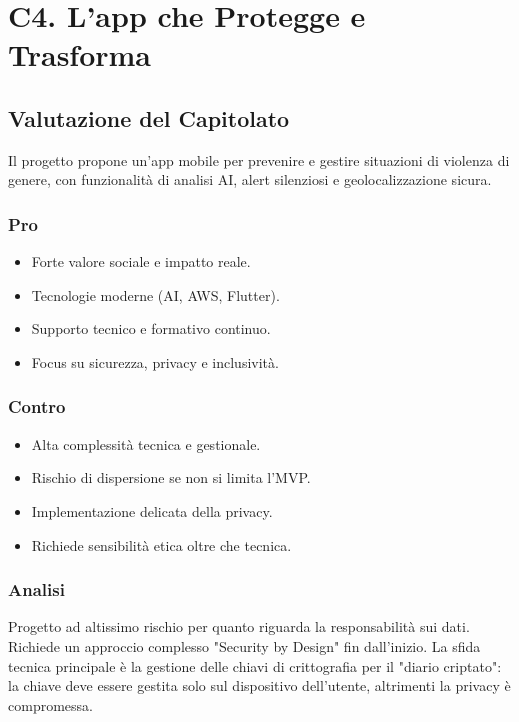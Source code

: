 \documentclass[a4paper, 11pt, oneside]{scrartcl} %
\begin{document}
\section{C4. L’app che Protegge e Trasforma}
\subsection*{Valutazione del Capitolato}
Il progetto propone un’app mobile per prevenire e gestire situazioni di violenza di genere, con funzionalità di analisi AI, alert silenziosi e geolocalizzazione sicura.

\subsubsection*{Pro}
\begin{itemize}
    \item Forte valore sociale e impatto reale.
    \item Tecnologie moderne (AI, AWS, Flutter).
    \item Supporto tecnico e formativo continuo.
    \item Focus su sicurezza, privacy e inclusività.
\end{itemize}

\subsubsection*{Contro}
\begin{itemize}
    \item Alta complessità tecnica e gestionale.
    \item Rischio di dispersione se non si limita l’MVP.
    \item Implementazione delicata della privacy.
    \item Richiede sensibilità etica oltre che tecnica.
\end{itemize}
\subsubsection*{Analisi}
Progetto ad altissimo rischio per quanto riguarda la responsabilità sui dati. Richiede un approccio complesso "Security by Design" fin dall'inizio. La sfida tecnica principale è la gestione delle chiavi di crittografia per il "diario criptato": la chiave deve essere gestita solo sul dispositivo dell'utente, altrimenti la privacy è compromessa.

\end{document}
